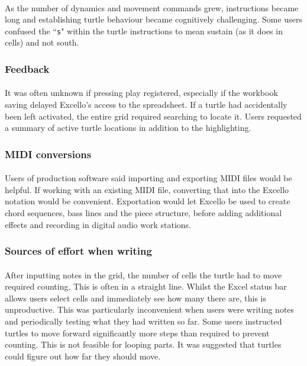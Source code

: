 \paragraph{} As the number of dynamics and movement commands grew, instructions became long and establishing turtle behaviour became cognitively challenging. Some users confused the ``\texttt{s}" within the turtle instructions to mean sustain (as it does in cells) and not south.

\subsubsection{Feedback}

\paragraph{} It was often unknown if pressing play registered, especially if the workbook saving delayed Excello's access to the spreadsheet. If a turtle had accidentally been left activated, the entire grid required searching to locate it. Users requested a summary of active turtle locations in addition to the highlighting.

\subsubsection{MIDI conversions}

\paragraph{} Users of production software said importing and exporting MIDI files would be helpful. If working with an existing MIDI file, converting that into the Excello notation would be convenient. Exportation would let Excello be used to create chord sequences, bass lines and the piece structure, before adding additional effects and recording in digital audio work stations.

\subsubsection{Sources of effort when writing}

\paragraph{} After inputting notes in the grid, the number of cells the turtle had to move required counting. This is often in a straight line. Whilst the Excel status bar allows users select cells and immediately see how many there are, this is unproductive. This was particularly inconvenient when users were writing notes and periodically testing what they had written so far. Some users instructed turtles to move forward significantly more steps than required to prevent counting. This is not feasible for looping parts. It was suggested that turtles could figure out how far they should move.


